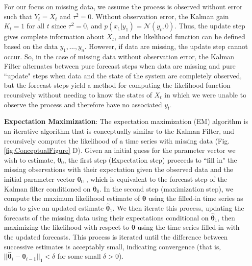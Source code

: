 For our focus on missing data, we assume the process is observed without error such that $Y_t = X_t$ and $\tau^2 = 0$. Without observation error, the Kalman gain $K_t = 1$ for all $t$ since $\tau^2 = 0$, and $p(x_1 | y_1) = \mathcal{N}(y_t, 0)$. Thus, the update step gives complete information about $X_t$, and the likelihood function can be defined based on the data $y_1,...,y_n$. However, if data are missing, the update step cannot occur. So, in the case of missing data without observation error, the Kalman Filter alternates between pure forecast steps when data are missing and pure ``update" steps when data and the state of the system are completely observed, but the forecast steps yield a method for computing the likelihood function recursively without needing to know the states of $X_t$ in which we were unable to observe the process and therefore have no associated $y_t$.

\textbf{Expectation Maximization}: The expectation maximization (EM) algorithm is an iterative algorithm that is conceptually similar to the Kalman Filter, and recursively computes the likelihood of a time series with missing data (Fig. \ref{fig:ConceptualFigure} D). Given an initial guess for the parameter vector we wish to estimate, ${\bm \theta}_0$, the first step (Expectation step) proceeds to ``fill in" the missing observations with their expectation given the observed data and the initial parameter vector ${\bm \theta}_0$ %
, which is equivalent to the forecast step of the Kalman filter conditioned on ${\bm \theta}_0$. In the second step (maximization step), we compute the maximum likelihood estimate of ${\bm \theta}$ using the filled-in time series as data to give an updated estimate $\hat {\bm \theta}_1$. We then iterate this process, updating the forecasts of the missing data using their expectations conditional on $\hat {\bm \theta}_1$, then maximizing the likelihood with respect to $\bm \theta$ using the time series filled-in with the updated forecasts. This process is iterated until the difference between successive estimates is acceptably small, indicating convergence (that is, $||\hat {\bm \theta}_i - \hat {\bm \theta}_{i-1}||_1 < \delta$ for some small $\delta > 0$).

